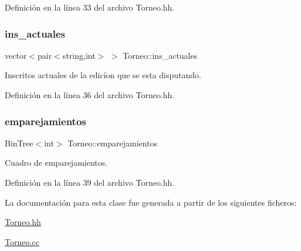 Definición en la línea 33 del archivo Torneo.\+hh.

\mbox{\label{class_torneo_a2293acd2d9d04bdefc603ab4cdce2c5a}} 
\subsubsection{\texorpdfstring{ins\+\_\+actuales}{ins\_actuales}}
{\footnotesize\ttfamily vector$<$pair$<$string,int$>$ $>$ Torneo\+::ins\+\_\+actuales\hspace{0.3cm}{\ttfamily [private]}}



Inscritos actuales de la edicíon que se esta disputando. 



Definición en la línea 36 del archivo Torneo.\+hh.

\mbox{\label{class_torneo_a18e1c1f6f9f658bc2c2390d3e2a9a853}} 
\subsubsection{\texorpdfstring{emparejamientos}{emparejamientos}}
{\footnotesize\ttfamily Bin\+Tree$<$int$>$ Torneo\+::emparejamientos\hspace{0.3cm}{\ttfamily [private]}}



Cuadro de emparejamientos. 



Definición en la línea 39 del archivo Torneo.\+hh.



La documentación para esta clase fue generada a partir de los siguientes ficheros\+:\begin{DoxyCompactItemize}
\item 
\hyperlink{_torneo_8hh}{Torneo.\+hh}\item 
\hyperlink{_torneo_8cc}{Torneo.\+cc}\end{DoxyCompactItemize}

